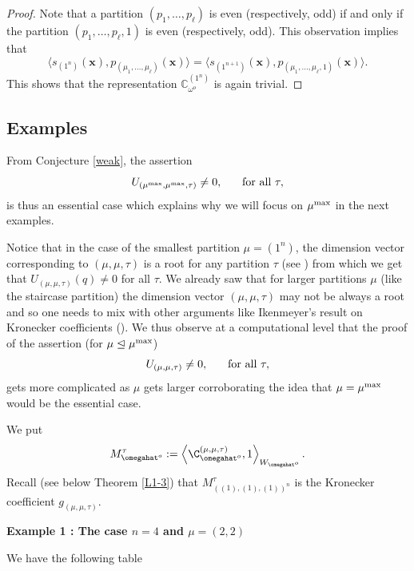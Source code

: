 \begin{proof}
	Note that a partition \((p_1, \ldots, p_\ell)\) is even (respectively, odd) if and only if the partition \((p_1, \ldots, p_\ell, 1)\) is even (respectively, odd). This observation implies that
	\[
	\langle s_{(1^n)}(\mathbf{x}), p_{(\mu_1, \ldots, \mu_\ell)}(\mathbf{x}) \rangle = \langle s_{(1^{n+1})}(\mathbf{x}), p_{(\mu_1, \ldots, \mu_\ell, 1)}(\mathbf{x}) \rangle.
	\]
	This shows that the representation \(\mathbb{C}_{\omega^o}^{(1^n)}\) is again trivial.
\end{proof}


\subsection{Examples}

From Conjecture \ref{weak}, the assertion 
$$
U_{(\mu^{\rm max},\mu^{\rm max},\tau)}\neq 0,\hspace{.5cm}\text{ for all }\tau,
$$
is thus an essential case which explains why we will focus on $\mu^{\rm max}$ in the next examples.


\begin{rema}\label{rem:maxi}Notice that in the case of the smallest partition $\mu=(1^n)$, the dimension vector corresponding to $(\mu,\mu,\tau)$ is  a root for any partition $\tau$  (see \cite[Proof of Proposition 33]{L1}) from which we get that  $U_{(\mu,\mu,\tau)}(q)\neq 0$ for all $\tau$. We already saw that for larger partitions $\mu$ (like the staircase partition) the dimension vector $(\mu,\mu,\tau)$ may not be always a root and so one needs to mix with other arguments like Ikenmeyer's result on Kronecker coefficients (\cite[Theorem 2.1]{Ik}). We thus observe at a computational level that  the proof of the assertion (for $\mu\trianglelefteq\mu^{\rm max}$)
	$$
	U_{(\mu,\mu,\tau)}\neq 0,\hspace{.5cm}\text{ for all }\tau,
	$$
	gets more complicated as $\mu$ gets larger corroborating the idea that $\mu=\mu^{\rm max}$ would be the essential case.
\end{rema}



We put
$$
M_{\omegahat^o}^\tau:=\left\langle \C_{\omegahat^o}^{(\mu,\mu,\tau)},1\right\rangle_{W_{\omegahat^o}}.
$$
Recall (see below Theorem \ref{L1-3}) that $M_{((1),(1),(1))^n}^\tau$ is the Kronecker coefficient $g_{(\mu,\mu,\tau)}$.


{\bf Example 1 : The case $n=4$ and $\mu=(2,2)$}


We have the following table 

